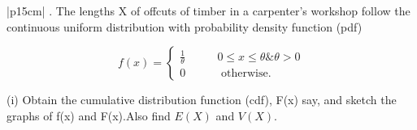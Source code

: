 \documentclass[a4paper,12pt]{article}
\begin{document}
\begin{table}[ht!]
 \centering
 \begin{tabular}{|p{15cm}|}
 . The lengths X of offcuts of timber in a carpenter’s workshop follow the continuous uniform distribution with probability density function (pdf)

\[ f(x) = \begin{cases}  \frac{1}{\theta}  & \qquad 0 \leq x \leq \theta \& \theta > 0 \\
0 & \qquad \mbox{ otherwise.}
\end{cases}\]



(i) Obtain the cumulative distribution function (cdf), F(x) say, and sketch the graphs of
f(x) and F(x).Also find $E(X)$ and $V(X)$.

\\ \hline
  \end{tabular}
\end{table}

 
\end{document}
